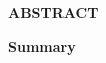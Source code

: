 \documentclass[9pt, letterpaper]{article}
\begin{document}
	\maketitle
	\begin{center}
		\textbf{ABSTRACT}
	\end{center}
	
	
	
	\begin{multicols}{2}
		
	\end{multicols}
	
	\begin{center}
		\textbf{Summary}
	\end{center}
	
\end{document}
